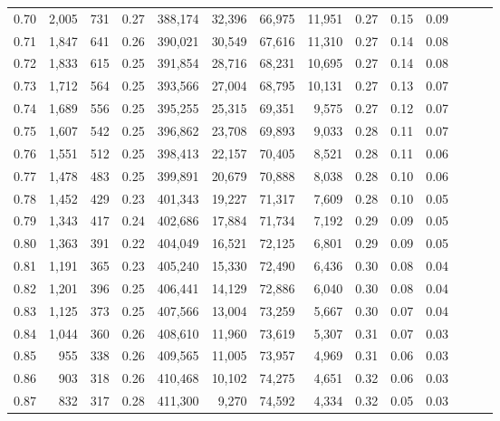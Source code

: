 \begin{tabular}{rrrrrrrrrrrrrr}
0.70 &   2,005 &    731 &  0.27 &  388,174 &   32,396 &  66,975 &  11,951 &  0.27 &  0.15 &      0.09 \\
0.71 &   1,847 &    641 &  0.26 &  390,021 &   30,549 &  67,616 &  11,310 &  0.27 &  0.14 &      0.08 \\
0.72 &   1,833 &    615 &  0.25 &  391,854 &   28,716 &  68,231 &  10,695 &  0.27 &  0.14 &      0.08 \\
0.73 &   1,712 &    564 &  0.25 &  393,566 &   27,004 &  68,795 &  10,131 &  0.27 &  0.13 &      0.07 \\
0.74 &   1,689 &    556 &  0.25 &  395,255 &   25,315 &  69,351 &   9,575 &  0.27 &  0.12 &      0.07 \\
0.75 &   1,607 &    542 &  0.25 &  396,862 &   23,708 &  69,893 &   9,033 &  0.28 &  0.11 &      0.07 \\
0.76 &   1,551 &    512 &  0.25 &  398,413 &   22,157 &  70,405 &   8,521 &  0.28 &  0.11 &      0.06 \\
0.77 &   1,478 &    483 &  0.25 &  399,891 &   20,679 &  70,888 &   8,038 &  0.28 &  0.10 &      0.06 \\
0.78 &   1,452 &    429 &  0.23 &  401,343 &   19,227 &  71,317 &   7,609 &  0.28 &  0.10 &      0.05 \\
0.79 &   1,343 &    417 &  0.24 &  402,686 &   17,884 &  71,734 &   7,192 &  0.29 &  0.09 &      0.05 \\
0.80 &   1,363 &    391 &  0.22 &  404,049 &   16,521 &  72,125 &   6,801 &  0.29 &  0.09 &      0.05 \\
0.81 &   1,191 &    365 &  0.23 &  405,240 &   15,330 &  72,490 &   6,436 &  0.30 &  0.08 &      0.04 \\
0.82 &   1,201 &    396 &  0.25 &  406,441 &   14,129 &  72,886 &   6,040 &  0.30 &  0.08 &      0.04 \\
0.83 &   1,125 &    373 &  0.25 &  407,566 &   13,004 &  73,259 &   5,667 &  0.30 &  0.07 &      0.04 \\
0.84 &   1,044 &    360 &  0.26 &  408,610 &   11,960 &  73,619 &   5,307 &  0.31 &  0.07 &      0.03 \\
0.85 &     955 &    338 &  0.26 &  409,565 &   11,005 &  73,957 &   4,969 &  0.31 &  0.06 &      0.03 \\
0.86 &     903 &    318 &  0.26 &  410,468 &   10,102 &  74,275 &   4,651 &  0.32 &  0.06 &      0.03 \\
0.87 &     832 &    317 &  0.28 &  411,300 &    9,270 &  74,592 &   4,334 &  0.32 &  0.05 &      0.03 \\

\end{tabular}
